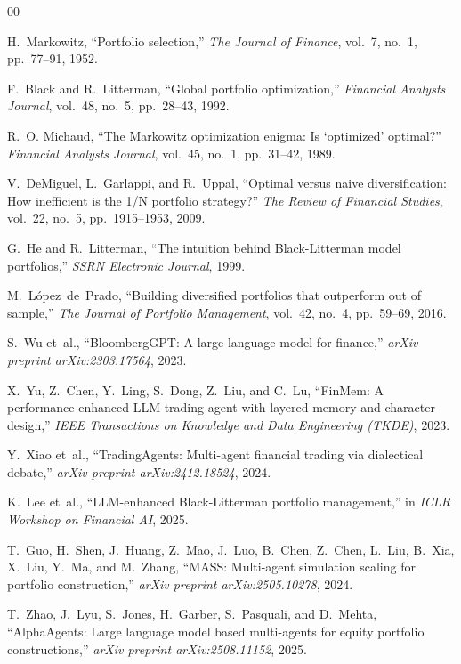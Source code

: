 \documentclass[conference]{IEEEtran}
\begin{document}
\begin{thebibliography}{00}

H.~Markowitz, ``Portfolio selection,'' \emph{The Journal of Finance}, vol.~7, no.~1, pp.~77--91, 1952.

F.~Black and R.~Litterman, ``Global portfolio optimization,'' \emph{Financial Analysts Journal}, vol.~48, no.~5, pp.~28--43, 1992.

R.~O. Michaud, ``The Markowitz optimization enigma: Is `optimized' optimal?'' \emph{Financial Analysts Journal}, vol.~45, no.~1, pp.~31--42, 1989.

V.~DeMiguel, L.~Garlappi, and R.~Uppal, ``Optimal versus naive diversification: How inefficient is the 1/N portfolio strategy?'' \emph{The Review of Financial Studies}, vol.~22, no.~5, pp.~1915--1953, 2009.

G.~He and R.~Litterman, ``The intuition behind Black-Litterman model portfolios,'' \emph{SSRN Electronic Journal}, 1999.

M.~L{\'o}pez~de~Prado, ``Building diversified portfolios that outperform out of sample,'' \emph{The Journal of Portfolio Management}, vol.~42, no.~4, pp.~59--69, 2016.

S.~Wu et~al., ``BloombergGPT: A large language model for finance,'' \emph{arXiv preprint arXiv:2303.17564}, 2023.

X.~Yu, Z.~Chen, Y.~Ling, S.~Dong, Z.~Liu, and C.~Lu, ``FinMem: A performance-enhanced LLM trading agent with layered memory and character design,'' \emph{IEEE Transactions on Knowledge and Data Engineering (TKDE)}, 2023.

Y.~Xiao et~al., ``TradingAgents: Multi-agent financial trading via dialectical debate,'' \emph{arXiv preprint arXiv:2412.18524}, 2024.

K.~Lee et~al., ``LLM-enhanced Black-Litterman portfolio management,'' in \emph{ICLR Workshop on Financial AI}, 2025.

T.~Guo, H.~Shen, J.~Huang, Z.~Mao, J.~Luo, B.~Chen, Z.~Chen, L.~Liu, B.~Xia, X.~Liu, Y.~Ma, and M.~Zhang, ``MASS: Multi-agent simulation scaling for portfolio construction,'' \emph{arXiv preprint arXiv:2505.10278}, 2024.

T.~Zhao, J.~Lyu, S.~Jones, H.~Garber, S.~Pasquali, and D.~Mehta, ``AlphaAgents: Large language model based multi-agents for equity portfolio constructions,'' \emph{arXiv preprint arXiv:2508.11152}, 2025.


\end{thebibliography}
\end{document}
